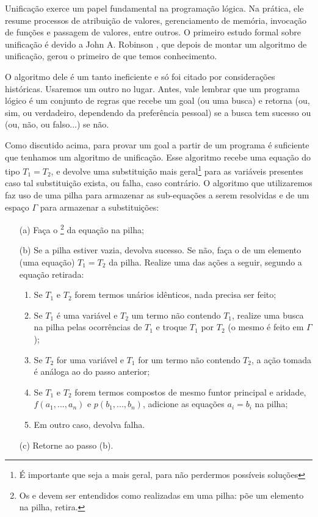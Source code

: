 Unificação exerce um papel fundamental na programação lógica. Na
prática, ele resume processos de atribuição de valores, gerenciamento
de memória, invocação de funções e passagem de valores, entre
outros. O primeiro estudo formal sobre unificação é devido a John
A. Robinson \cite{robinson}, que depois de montar um algoritmo de
unificação, gerou o primeiro de que temos conhecimento. 

O algoritmo dele é um tanto ineficiente e só foi citado por
considerações históricas. Usaremos um outro no lugar. Antes, vale lembrar que um
programa lógico é um conjunto de regras que recebe um goal (ou uma
busca) e retorna  (ou, sim, ou verdadeiro,
dependendo da preferência pessoal) se a busca tem sucesso ou
 (ou, não, ou falso...) se não. 

Como discutido acima, para provar um goal a partir de um programa é
suficiente que tenhamos um algoritmo de unificação. Esse algoritmo
recebe uma equação do tipo $T_1 = T_2$, e devolve uma substituição
mais geral\footnote{É importante que seja a mais geral, para não
  perdermos possíveis soluções} 
para as variáveis presentes caso tal substituição exista, ou falha,
caso contrário. O algoritmo que utilizaremos faz uso de uma pilha para
armazenar as sub-equações a serem resolvidas e de um espaço 
$\Gamma$ para armazenar a substituições:

\begin{itemize}
    \item[(a)] Faça o \footnote{Os  e  devem ser entendidos como realizadas em uma pilha:  põe um elemento na pilha,  retira.} da equação na pilha;
    \item[(b)] Se a pilha estiver vazia, devolva sucesso. Se não, faça o  de um elemento (uma equação) $T_1 = T_2$ da pilha. Realize uma das ações a seguir, segundo a equação retirada:
      \begin{enumerate}
        \item Se $T_1$ e $T_2$ forem termos unários idênticos, nada precisa ser feito;
        \item Se $T_1$ é uma variável e $T_2$ um termo não contendo $T_1$, realize uma busca na pilha pelas ocorrências de $T_1$ e troque $T_1$ por $T_2$ (o mesmo é feito em $\Gamma$);
        \item Se $T_2$ for uma variável e $T_1$ for um termo não contendo $T_2$, a ação tomada é análoga ao do passo anterior;
        \item Se $T_1$ e $T_2$ forem termos compostos de mesmo funtor principal e aridade, $f(a_1, ..., a_n)$ e $p(b_1, ..., b_n)$, adicione as equações $a_i = b_i$ na pilha;
        \item Em outro caso, devolva falha.
      \end{enumerate}
    \item[(c)] Retorne ao passo (b).
\end{itemize}






